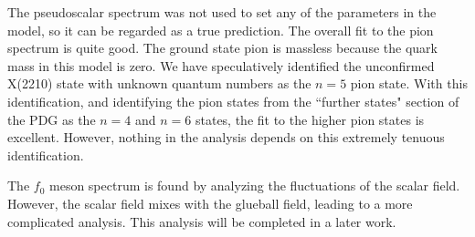 The pseudoscalar spectrum was not used to set any of the parameters in the model, so it can be regarded as a true prediction. 
The overall fit to the pion spectrum is quite good.
The ground state pion is massless because the quark mass in this model is zero.
We have speculatively identified the unconfirmed X(2210) state with unknown quantum numbers as the $n=5$ pion state.
With this identification, and identifying the pion states from the ``further states" section of the PDG as the $n=4$ and $n=6$ states, the fit to the higher pion states is excellent.
However, nothing in the analysis depends on this extremely tenuous identification.

The $f_0$ meson spectrum is found by analyzing the fluctuations of the scalar field. 
However, the scalar field mixes with the glueball field, leading to a more complicated analysis.
This analysis will be completed in a later work.
